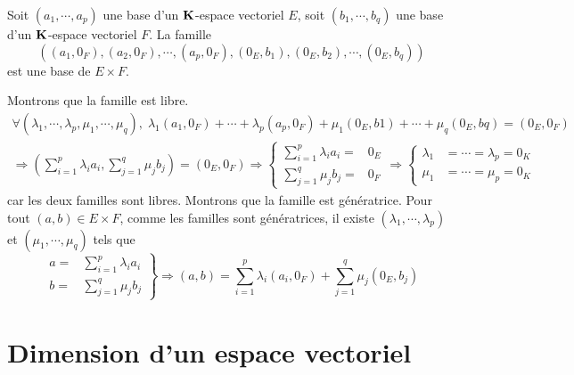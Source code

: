 \begin{propn}\label{baseprod}
Soit $(a_1,\cdots,a_p)$ une base d'un $\mathbf{K}$-espace vectoriel $E$, soit $(b_1,\cdots,b_q)$ une base d'un $\mathbf{K}$-espace vectoriel $F$. La famille
\begin{displaymath}
 \left( 
(a_1,0_F),(a_2,0_F),\cdots,(a_p,0_F),(0_E,b_1),(0_E,b_2),\cdots,(0_E,b_q)
\right) 
\end{displaymath}
est une base de $E\times F$.
\end{propn}
\begin{demo}
Montrons que la famille est libre.
\begin{multline*}
\forall(\lambda_1,\cdots,\lambda_p,\mu_1,\cdots , \mu_q), \;
\lambda_1(a_1,0_F) + \cdots + \lambda_p(a_p,0_F) + \mu_1(0_E,b1) + \cdots + \mu_q(0_E,bq) = (0_E, 0_F) \\
\Rightarrow
\left( \sum_{i=1}^p \lambda_i a_i, \sum_{j=1}^q \mu_j b_j\right) = (0_E, 0_F) 
\Rightarrow
\left\lbrace 
\begin{aligned}
  \sum_{i=1}^p \lambda_i a_i =& 0_E \\
  \sum_{j=1}^q \mu_j b_j =& 0_F
\end{aligned}
\right. 
\Rightarrow
\left\lbrace 
\begin{aligned}
\lambda_1& = \cdots = \lambda_p = 0_K \\
\mu_1& = \cdots = \mu_p = 0_K
\end{aligned}
\right. 
\end{multline*}
car les deux familles sont libres.\newline
Montrons que la famille est génératrice. Pour tout $(a,b)\in E\times F$, comme les familles sont génératrices, il existe $(\lambda_1, \cdots, \lambda_p)$ et $(\mu_1,\cdots,\mu_q)$ tels que
\begin{displaymath}
  \left. 
  \begin{aligned}
    a =& \sum_{i=1}^p \lambda_i a_i \\ b =& \sum_{j=1}^q \mu_j b_j
  \end{aligned}
\right\rbrace 
\Rightarrow
(a,b)= \sum_{i=1}^p \lambda_i (a_i,0_F) + \sum_{j=1}^q \mu_j (0_E,b_j)
\end{displaymath}
\end{demo}

\section{ Dimension d'un espace vectoriel}
